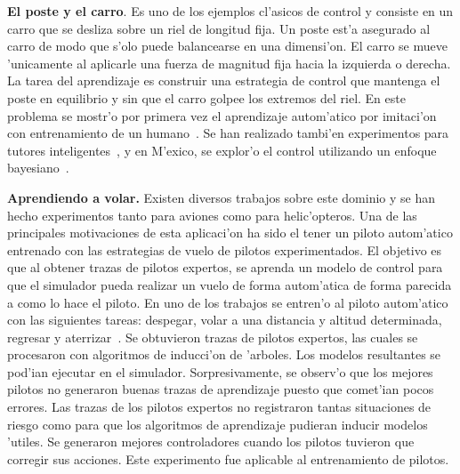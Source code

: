 \documentclass[11pt]{article}
\begin{document}
\textbf{El poste y el carro}. Es uno de los ejemplos cl'asicos de control y consiste en un carro que se desliza sobre un riel de longitud fija. Un poste est'a asegurado al carro de modo que s'olo puede balancearse en una dimensi'on. El carro se mueve 'unicamente al aplicarle una fuerza de magnitud fija hacia la izquierda o derecha. La tarea del aprendizaje es construir una estrategia de control que mantenga el poste en equilibrio y sin que el carro golpee los extremos del riel. En este problema se mostr'o por primera vez el aprendizaje autom'atico por imitaci'on con entrenamiento de un humano~\cite{Michie94buildingsymbolic,Suc99skillmodelling}. Se han realizado tambi'en experimentos para tutores inteligentes~\cite{And99modellingof}, y en M'exico, se explor'o el control utilizando un enfoque bayesiano~\cite{freyre}.






\medskip
\noindent

\textbf{Aprendiendo a volar.} Existen diversos trabajos sobre este dominio y se han hecho experimentos tanto para aviones como para helic'opteros. Una de las principales motivaciones de esta aplicaci'on ha sido el tener un piloto autom'atico entrenado con las estrategias de vuelo de pilotos experimentados. El objetivo es que al obtener trazas de pilotos expertos, se aprenda un modelo de control para que el simulador pueda realizar un vuelo de forma autom'atica de forma parecida a como lo hace el piloto.  En uno de los trabajos se entren'o al piloto autom'atico con las siguientes tareas: despegar, volar a una distancia y altitud determinada, regresar y aterrizar~\cite{Sammut92learningto}. Se obtuvieron trazas de pilotos expertos, las cuales se procesaron con algoritmos de inducci'on de 'arboles. Los modelos resultantes se pod'ian ejecutar en el simulador. Sorpresivamente, se observ'o que los mejores pilotos no generaron buenas trazas de aprendizaje puesto que comet'ian pocos errores. Las trazas de los pilotos expertos no registraron tantas situaciones de riesgo como para que los algoritmos de aprendizaje pudieran inducir modelos 'utiles. Se generaron mejores controladores cuando los pilotos tuvieron que corregir sus acciones. Este experimento fue aplicable al entrenamiento de pilotos.
\end{document}
